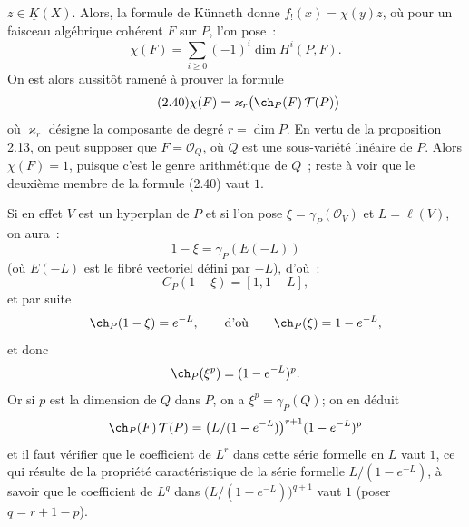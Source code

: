 \(z\in\underline K(X)\).
Alors, la formule de Künneth donne \(f_!(x)=\chi(y)z\), où pour un faisceau algébrique cohérent \(F\) sur \(P\), l'on pose~:
\[
  \chi(F)=\sum_{i\geq 0}(-1)^i\dim H^i(P,F).
\]
On est alors aussitôt ramené à prouver la formule
\begin{equation}\tag{2.40}
  \chi(F)=\varkappa_r\bigl(\ch_P(F)\,\mathcal T(P)\bigr)
\end{equation}
où \(\varkappa_r\) désigne la composante de degré \(r=\dim P\). En vertu de la proposition 2.13, on peut supposer que \(F=\mathcal O_Q\), où \(Q\) est une sous-variété linéaire de \(P\). Alors \(\chi(F)=1\), puisque c'est le genre arithmétique de \(Q\)~; reste à voir que le deuxième membre de la formule (2.40) vaut \(1\).

Si en effet \(V\) est un hyperplan de \(P\) et si l'on pose \(\xi=\gamma_P(\mathcal O_V)\) et \(L=\ell(V)\), on aura~:
\[
  1-\xi=\gamma_P(E(-L))
\]
(où \(E(-L)\) est le fibré vectoriel défini par \(-L\)), d'où~:
\[
  C_P(1-\xi)=[1,1-L],
\]
et par suite
\[
  \ch_P(1-\xi)=e^{-L},\qquad\text{d'où}\qquad \ch_P(\xi)=1-e^{-L},
\]
et donc
\[
  \ch_P(\xi^p)=(1-e^{-L})^p.
\]
Or si \(p\) est la dimension de \(Q\) dans \(P\), on a \(\xi^p=\gamma_P(Q)\); on en déduit
\[
  \ch_P(F)\,\mathcal T(P)
  =
  \bigl(L/(1-e^{-L})\bigr)^{r+1}(1-e^{-L})^p
\]
et il faut vérifier que le coefficient de \(L^r\) dans cette série formelle en \(L\) vaut \(1\), ce qui résulte de la propriété caractéristique de la série formelle \(L/(1-e^{-L})\), à savoir que le coefficient de \(L^q\) dans \(\bigl(L/(1-e^{-L})\bigr)^{q+1}\) vaut \(1\) (poser \(q=r+1-p\)).

